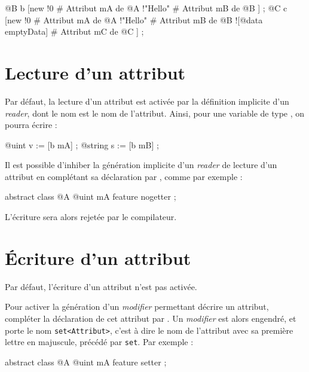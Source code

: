 \begin{galgascode}
@B b [new
  !0 # Attribut mA de @A
  !"Hello" # Attribut mB de @B
] ;
@C c [new
  !0 # Attribut mA de @A
  !"Hello" # Attribut mB de @B
  ![@data emptyData] # Attribut mC de @C
] ;
\end{galgascode}








\section{Lecture d'un attribut}

Par défaut, la lecture d'un attribut est activée par la définition implicite d'un \emph{reader}, dont le nom est le nom de l'attribut. Ainsi, pour une variable  de type , on pourra écrire :

\begin{galgascode}
@uint v := [b mA] ;
@string s := [b mB] ;
\end{galgascode}

Il est possible d'inhiber la génération implicite d'un \emph{reader} de lecture d'un attribut en complétant sa déclaration par , comme par exemple :

\begin{galgascode}
abstract class @A {
  @uint mA feature nogetter ;
}
\end{galgascode}

L'écriture \galgas{[b mA]} sera alors rejetée par le compilateur.









\section{Écriture d'un attribut}

Par défaut, l'écriture d'un attribut n'est pas activée.

Pour activer la génération d'un \emph{modifier} permettant décrire un attribut, compléter la déclaration de cet attribut par . Un \emph{modifier} est alors engendré, et porte le nom \texttt{set<Attribut>}, c'est à dire le nom de l'attribut avec sa première lettre en majuscule, précédé par \texttt{set}. Par exemple :

\begin{galgascode}
abstract class @A {
  @uint mA feature setter ;
}
\end{galgascode}


